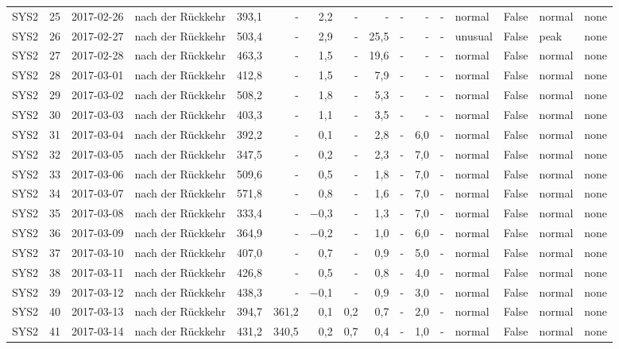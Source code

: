 \begin{tabular}{lrllrrrrrrrrlrll}
SYS2 & 25 & 2017-02-26 & nach der Rückkehr & 393,1 & - & 2,2 & - & - & - & - & - & normal & False & normal & none \\
SYS2 & 26 & 2017-02-27 & nach der Rückkehr & 503,4 & - & 2,9 & - & 25,5 & - & - & - & unusual & False & peak & none \\
SYS2 & 27 & 2017-02-28 & nach der Rückkehr & 463,3 & - & 1,5 & - & 19,6 & - & - & - & normal & False & normal & none \\
SYS2 & 28 & 2017-03-01 & nach der Rückkehr & 412,8 & - & 1,5 & - & 7,9 & - & - & - & normal & False & normal & none \\
SYS2 & 29 & 2017-03-02 & nach der Rückkehr & 508,2 & - & 1,8 & - & 5,3 & - & - & - & normal & False & normal & none \\
SYS2 & 30 & 2017-03-03 & nach der Rückkehr & 403,3 & - & 1,1 & - & 3,5 & - & - & - & normal & False & normal & none \\
SYS2 & 31 & 2017-03-04 & nach der Rückkehr & 392,2 & - & 0,1 & - & 2,8 & - & 6,0 & - & normal & False & normal & none \\
SYS2 & 32 & 2017-03-05 & nach der Rückkehr & 347,5 & - & 0,2 & - & 2,3 & - & 7,0 & - & normal & False & normal & none \\
SYS2 & 33 & 2017-03-06 & nach der Rückkehr & 509,6 & - & 0,5 & - & 1,8 & - & 7,0 & - & normal & False & normal & none \\
SYS2 & 34 & 2017-03-07 & nach der Rückkehr & 571,8 & - & 0,8 & - & 1,6 & - & 7,0 & - & normal & False & normal & none \\
SYS2 & 35 & 2017-03-08 & nach der Rückkehr & 333,4 & - & $-$0,3 & - & 1,3 & - & 7,0 & - & normal & False & normal & none \\
SYS2 & 36 & 2017-03-09 & nach der Rückkehr & 364,9 & - & $-$0,2 & - & 1,0 & - & 6,0 & - & normal & False & normal & none \\
SYS2 & 37 & 2017-03-10 & nach der Rückkehr & 407,0 & - & 0,7 & - & 0,9 & - & 5,0 & - & normal & False & normal & none \\
SYS2 & 38 & 2017-03-11 & nach der Rückkehr & 426,8 & - & 0,5 & - & 0,8 & - & 4,0 & - & normal & False & normal & none \\
SYS2 & 39 & 2017-03-12 & nach der Rückkehr & 438,3 & - & $-$0,1 & - & 0,9 & - & 3,0 & - & normal & False & normal & none \\
SYS2 & 40 & 2017-03-13 & nach der Rückkehr & 394,7 & 361,2 & 0,1 & 0,2 & 0,7 & - & 2,0 & - & normal & False & normal & none \\
SYS2 & 41 & 2017-03-14 & nach der Rückkehr & 431,2 & 340,5 & 0,2 & 0,7 & 0,4 & - & 1,0 & - & normal & False & normal & none \\

\end{tabular}
